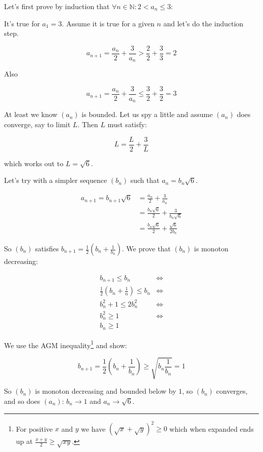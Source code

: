 \begin{solution}
Let's first prove by induction that $\forall n \in \mathbb{N}: 2 < a_n \leq 3$:

It's true for $a_1=3$. Assume it is true for a given $n$ and let's do the induction step.

$$
a_{n+1} = \frac{a_n}{2} + \frac{3}{a_n} > \frac{2}{2} + \frac{3}{3} = 2
$$

Also

$$
a_{n+1} = \frac{a_n}{2} + \frac{3}{a_n} \leq \frac{3}{2} + \frac{3}{2} = 3
$$

At least we know $(a_n)$ is bounded. Let us spy a little and assume $(a_n)$ does converge, say to limit $L$. Then $L$ must satisfy: 

$$
L = \frac{L}{2} + \frac{3}{L}
$$

which works out to $L = \sqrt{6}$.

Let's try with a simpler sequence $(b_n)$ such that $a_n = b_n \sqrt{6}$. 

\begin{align*}
  a_{n+1} = b_{n + 1} \sqrt{6} &= \frac{a_n}{2} + \frac{3}{a_n} \\
                              &= \frac{b_n \sqrt{6}}{2} + \frac{3}{b_n \sqrt{6}} \\
                              &= \frac{b_n \sqrt{6}}{2} + \frac{\sqrt{6}}{2 b_n}
\end{align*}

So $(b_n)$ satisfies $b_{n+1} = \frac{1}{2}(b_n + \frac{1}{b_n})$. We prove that $(b_n)$ is monoton decreasing:

\begin{align*}
  b_{n+1} \leq b_n & \Leftrightarrow \\
  \frac{1}{2}(b_n + \frac{1}{n}) \leq b_n & \Leftrightarrow \\
  b_n^2 + 1 \leq 2 b_n^2  & \Leftrightarrow \\
  b_n^2 \geq 1 & \Leftrightarrow \\
  b_n \geq 1
\end{align*}

We use the AGM inequality\footnote{For positive $x$ and $y$ we have $(\sqrt{x} + \sqrt{y})^2 \geq 0$ which when expanded ends up at $\frac{x + y}{2} \geq \sqrt{xy}$. } and show:

$$
b_{n+1} = \frac{1}{2}(b_n + \frac{1}{b_n}) \geq \sqrt{b_n \frac{1}{b_n}} = 1
$$

So $(b_n)$ is monoton decreasing and bounded below by $1$, so $(b_n)$ converges, and so does $(a_n)$: $b_n \to 1$ and $a_n \to \sqrt{6}$.

\end{solution}

